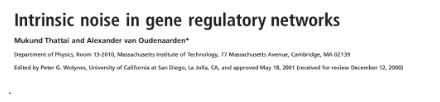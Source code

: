 \documentclass{beamer}
\begin{document}

\begin{frame}
\begin{figure}[p]
    \centering
    \includegraphics[width=1\textwidth]{title.png}\\
    \tiny \cite{p1}.
\end{figure}
\end{frame}
\end{document}
